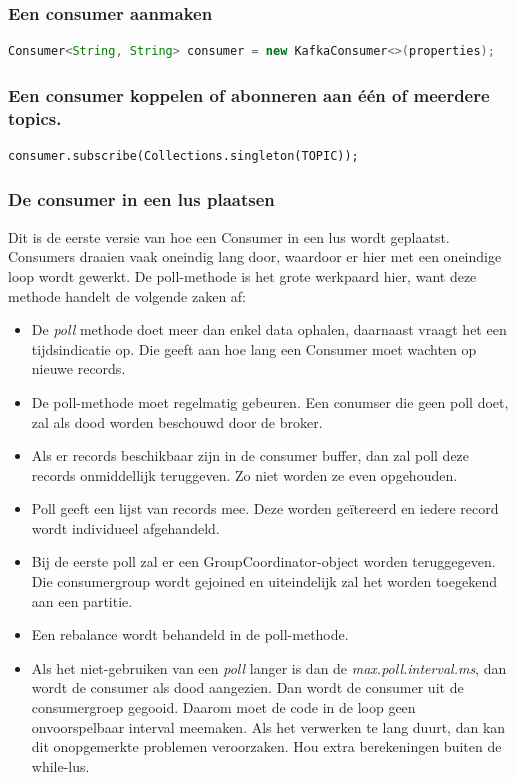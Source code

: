 \documentclass[a4paper,10pt,twoside]{report}
\begin{document}
\subsubsection{Een consumer aanmaken}

\begin{lstlisting}[language=Java]
Consumer<String, String> consumer = new KafkaConsumer<>(properties);
\end{lstlisting}

\subsubsection{Een consumer koppelen of abonneren aan één of meerdere topics.}

\begin{lstlisting}
consumer.subscribe(Collections.singleton(TOPIC));
\end{lstlisting}

\subsubsection{De consumer in een lus plaatsen}

Dit is de eerste versie van hoe een Consumer in een lus wordt geplaatst. Consumers draaien vaak oneindig lang door, waardoor er hier met een oneindige loop wordt gewerkt. De poll-methode is het grote werkpaard hier, want deze methode handelt de volgende zaken af:

\begin{itemize}
	\item De \textit{poll} methode doet meer dan enkel data ophalen, daarnaast vraagt het een tijdsindicatie op. Die geeft aan hoe lang een Consumer moet wachten op nieuwe records.
	\item De poll-methode moet regelmatig gebeuren. Een conumser die geen poll doet, zal als dood worden beschouwd door de broker. 
	\item Als er records beschikbaar zijn in de consumer buffer, dan zal poll deze records onmiddellijk teruggeven. Zo niet worden ze even opgehouden.
	\item Poll geeft een lijst van records mee. Deze worden geïtereerd en iedere record wordt individueel afgehandeld.
	\item Bij de eerste poll zal er een GroupCoordinator-object worden teruggegeven. Die consumergroup wordt gejoined en uiteindelijk zal het worden toegekend aan een partitie.
	\item Een rebalance wordt behandeld in de poll-methode.
	\item Als het niet-gebruiken van een \textit{poll} langer is dan de \textit{max.poll.interval.ms}, dan wordt de consumer als dood aangezien. Dan wordt de consumer uit de consumergroep gegooid. Daarom moet de code in de loop geen onvoorspelbaar interval meemaken. Als het verwerken te lang duurt, dan kan dit onopgemerkte problemen veroorzaken. Hou extra berekeningen buiten de while-lus. 
\end{itemize}
\end{document}
